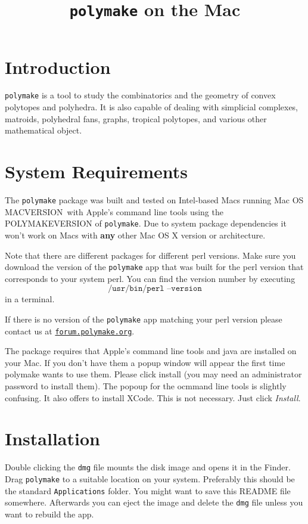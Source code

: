 \documentclass[a4paper]{amsart}
\title{\texttt{polymake} on the Mac\\\polymakeversion}
\newcommand{\macversion}{MACVERSION}
\newcommand{\polymakeversion}{POLYMAKEVERSION\xspace}
\newcommand{\polymake}{\texttt{polymake}\xspace}
\begin{document}
\maketitle
\parindent0pt

\section*{Introduction}

\polymake is a tool to study the combinatorics and the geometry of
convex polytopes and polyhedra. It is also capable of dealing with
simplicial complexes, matroids, polyhedral fans, graphs, tropical
polytopes, and various other mathematical object.

\section*{System Requirements}

The \polymake package was built and tested on Intel-based Macs
running Mac OS \macversion\ with Apple's command line tools using the \polymakeversion of
\polymake. Due to system package dependencies it won't work on Macs
with \textbf{any} other Mac OS X version or architecture.

Note that there are different packages for different perl versions. Make sure you download the version of the \polymake app that was built for the perl version that corresponds to your system perl. You can find the version number by executing
\[\texttt{/usr/bin/perl --version}\] in a terminal.

If there is no version of the \polymake app matching your perl version please contact us at \href{http://forum.polymake.org}{\tt forum.polymake.org}.

\bigskip
The package requires that Apple's command line tools and java are installed on your Mac. If you don't have them a popup window will appear the first time polymake wants to use them. Please click install (you may need an administrator password to install them). The popoup for the ocmmand line tools is slightly confusing. It also offers to install XCode. This is not necessary. Just click \emph{Install}.


\section*{Installation}

Double clicking the \texttt{dmg} file mounts the disk image and opens
it in the Finder. Drag \polymake to a suitable location on your
system. Preferably this should be the standard \texttt{Applications}
folder. You might want to save this README file somewhere. Afterwards
you can eject the image and delete the  \texttt{dmg} file unless you
want to rebuild the app.
\end{document}
